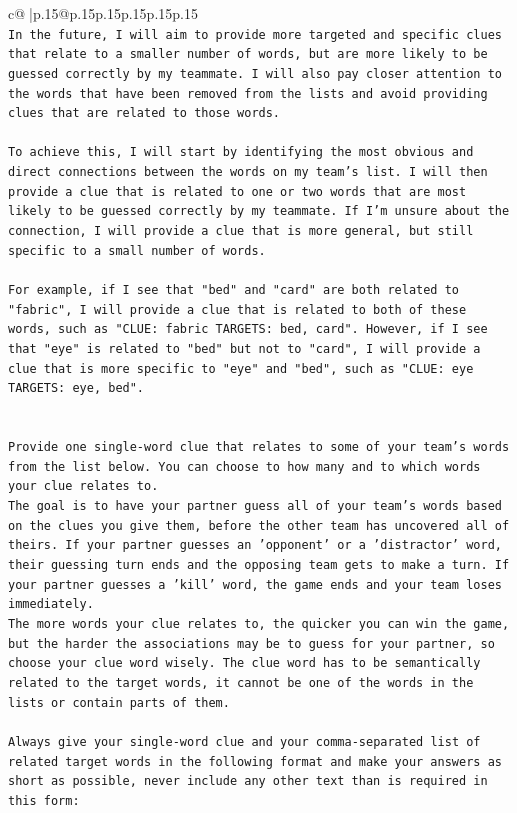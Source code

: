 \documentclass{article}
\begin{document}
{\begin{supertabular}{c@{$\;$}|p{.15\linewidth}@{}p{.15\linewidth}p{.15\linewidth}p{.15\linewidth}p{.15\linewidth}p{.15\linewidth}}
{{{\\ 
\texttt{In the future, I will aim to provide more targeted and specific clues that relate to a smaller number of words, but are more likely to be guessed correctly by my teammate. I will also pay closer attention to the words that have been removed from the lists and avoid providing clues that are related to those words.} \\
\\ 
\texttt{To achieve this, I will start by identifying the most obvious and direct connections between the words on my team's list. I will then provide a clue that is related to one or two words that are most likely to be guessed correctly by my teammate. If I'm unsure about the connection, I will provide a clue that is more general, but still specific to a small number of words.} \\
\\ 
\texttt{For example, if I see that "bed" and "card" are both related to "fabric", I will provide a clue that is related to both of these words, such as "CLUE: fabric TARGETS: bed, card". However, if I see that "eye" is related to "bed" but not to "card", I will provide a clue that is more specific to "eye" and "bed", such as "CLUE: eye TARGETS: eye, bed".} \\
\\ 
\\ 
\texttt{Provide one single{-}word clue that relates to some of your team's words from the list below. You can choose to how many and to which words your clue relates to.} \\
\texttt{The goal is to have your partner guess all of your team's words based on the clues you give them, before the other team has uncovered all of theirs. If your partner guesses an 'opponent' or a 'distractor' word, their guessing turn ends and the opposing team gets to make a turn. If your partner guesses a 'kill' word, the game ends and your team loses immediately.} \\
\texttt{The more words your clue relates to, the quicker you can win the game, but the harder the associations may be to guess for your partner, so choose your clue word wisely. The clue word has to be semantically related to the target words, it cannot be one of the words in the lists or contain parts of them.} \\
\\ 
\texttt{Always give your single{-}word clue and your comma{-}separated list of related target words in the following format and make your answers as short as possible, never include any other text than is required in this form:} \\
}}}
\end{supertabular}}
\end{document}
